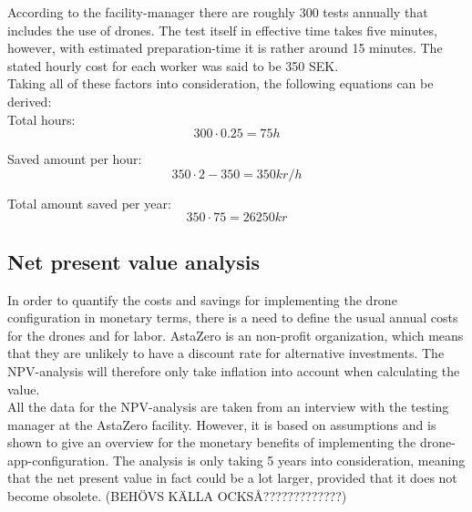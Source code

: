 According to the facility-manager there are roughly 300 tests annually that includes the use of drones. The test itself in effective time takes five minutes, however, with estimated preparation-time it is rather around 15 minutes. The stated hourly cost for each worker was said to be 350 SEK. 
\\

Taking all of these factors into consideration, the following equations can be derived:
\\

Total hours:
\begin{equation}
    300 \cdot 0.25 = 75 h
\end{equation}

Saved amount per hour:
\begin{equation}
    350 \cdot 2 - 350 = 350kr/h
\end{equation}

Total amount saved per year:
\begin{equation}
    350 \cdot 75 = 26250kr
\end{equation}


\subsection{Net present value analysis}
In order to quantify the costs and savings for implementing the drone configuration in monetary terms, there is a need to define the usual annual costs for the drones and for labor. AstaZero is an non-profit organization, which means that they are unlikely to have a discount rate for alternative investments. The NPV-analysis will therefore only take inflation into account when calculating the value. 
\\

All the data for the NPV-analysis are taken from an interview with the testing manager at the AstaZero facility. However, it is based on assumptions and is shown to give an overview for the monetary benefits of implementing the drone-app-configuration. The analysis is only taking 5 years into consideration, meaning that the net present value in fact could be a lot larger, provided that it does not become obsolete.
(BEHÖVS KÄLLA OCKSÅ?????????????)

